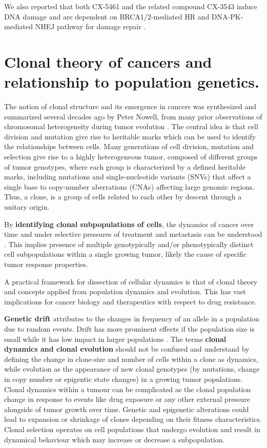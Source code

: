 We also reported that both CX-5461 and the related compound CX-3543 induce DNA damage and are dependent on BRCA1/2-mediated HR and DNA-PK-mediated NHEJ pathway for damage repair \cite{xu2017cx}.


\section{Clonal theory of cancers and relationship to population genetics.}
The notion of clonal structure and its emergence in cancers was synthesized and summarized several decades ago by Peter Nowell, from many prior observations of chromosomal heterogeneity during tumor evolution \cite{nowell1976clonal}. The central idea is that cell division and mutation give rise to heritable marks which can be used to identify the relationships between cells. Many generations of cell division, mutation and selection give rise to a highly heterogeneous tumor, composed of different groups of tumor genotypes, where each group is characterized by a defined heritable marks, including mutations and single-nucleotide variants (SNVs) that affect a single base to copy-number aberrations (CNAs) affecting large genomic regions. Thus, a clone, is a group of cells related to each other by descent through a unitary origin. 

By \textbf{identifying clonal subpopulations of cells}, the dynamics of cancer over time and under selective pressures of treatment and metastasis can be understood \cite{aparicio2013implications}. This implies presence of multiple genotypically and/or phenotypically distinct cell subpopulations within a single growing tumor, likely the cause of specific tumor response properties.

A practical framework for dissection of cellular dynamics is that of clonal theory and concepts applied from population dynamics and evolution. 
This has vast implications for cancer biology and therapeutics with respect to drug resistance. 

\textbf{Genetic drift} attributes to the changes in frequency of an allele in a population due to random events. Drift has more prominent effects if the population size is small while it has low impact in larger populations \cite{lynch2007origins}.
The terms \textbf{clonal dynamics and clonal evolution} should not be confused and understand by defining the change in clone-size and number of cells within a clone as dynamics, while evolution as the appearance of new clonal genotypes (by mutations, change in copy number or epigentic state changes) in a growing tumor populations. 
 Clonal dynamics within a tumour can be complicated as the clonal population change in response to events like drug exposure or any other external pressure alongside of tumor growth over time. Genetic and epigenetic alterations could lead to expansion or shrinkage of clones depending on their fitness characteristics. Clonal selection operates on cell populations that undergo evolution and result in dynamical behaviour which may increase or decrease a subpopulation.

